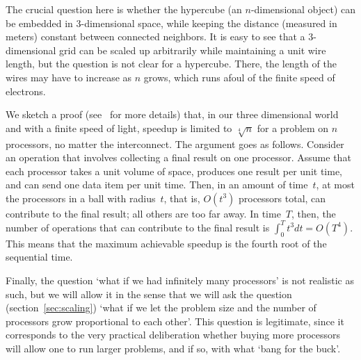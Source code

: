 The crucial question here is whether the hypercube (an $n$-dimensional
object) can be embedded in 3-dimensional space, while keeping the
distance (measured in meters) constant between connected neighbors.
It is easy to see that a 3-dimensional grid can be scaled up
arbitrarily while maintaining a unit wire length, but the question is
not clear for a hypercube.  There, the length of the wires may have to
increase as $n$ grows, which runs afoul of the finite speed of
electrons.

We sketch a proof (see~\cite{Fisher:fastparallel} for more details)
that, in our three dimensional world and with a finite speed of light,
speedup is limited to $\sqrt[4]{n}$ for a problem on $n$ processors,
no matter the interconnect. The argument goes as follows. Consider an
operation that involves collecting a final result on one processor. Assume
that each processor takes a unit volume of space, produces one result
per unit time, and can send one data item per unit time. Then, in an
amount of time~$t$, at most the processors in a ball with radius~$t$,
that is, $O(t^3)$ processors total, can contribute to the
final result; all others are too far away. In time~$T$, then, the
number of operations 
that can contribute to the final result is $\int_0^T
t^3dt=O(T^4)$. This means that the maximum achievable speedup is the
fourth root of the sequential time.

Finally, the question `what if we had infinitely many processors' is
not realistic as such, but we will allow it in the sense that we will
ask the  question (section~\ref{sec:scaling})
`what if we let the problem size and the number of processors grow
proportional to each other'. This question is legitimate, since it
corresponds to the very practical deliberation whether buying more
processors will allow one to run larger problems, and if so, with what
`bang for the buck'.


